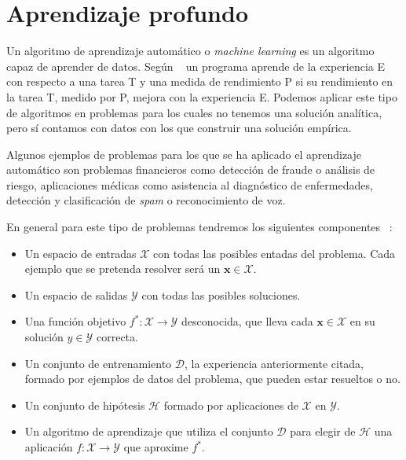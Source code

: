 
\chapter{Aprendizaje profundo}\label{deeplearning}

Un algoritmo de aprendizaje automático o \textit{machine learning} es un algoritmo capaz de aprender de datos. Según ~\cite{mitchell1997} un programa aprende de la experiencia E con respecto a una tarea T y una medida de rendimiento P si su rendimiento en la tarea T, medido por P, mejora con la experiencia E. Podemos aplicar este tipo de algoritmos en problemas para los cuales no tenemos una solución analítica, pero sí contamos con datos con los que construir una solución empírica.

Algunos ejemplos de problemas para los que se ha aplicado el aprendizaje automático son problemas financieros como detección de fraude o análisis de riesgo, aplicaciones médicas como asistencia al diagnóstico de enfermedades, detección y clasificación de \textit{spam} o reconocimiento de voz.

En general para este tipo de problemas tendremos los siguientes componentes ~\cite{abu2012learning}:

\begin{itemize}
  \item Un espacio de entradas $\mathcal{X}$ con todas las posibles entadas del problema. Cada ejemplo que se pretenda resolver será un $\textbf{x} \in \mathcal{X}$.
  \item Un espacio de salidas $\mathcal{Y}$ con todas las posibles soluciones.
  \item Una función objetivo $f^*:\mathcal{X} \rightarrow \mathcal{Y}$ desconocida, que lleva cada $\textbf{x} \in \mathcal{X}$ en su solución $y \in \mathcal{Y}$ correcta.
  \item Un conjunto de entrenamiento $\mathcal{D}$, la experiencia anteriormente citada, formado por ejemplos de datos del problema, que pueden estar resueltos o no.
  \item Un conjunto de hipótesis $\mathcal{H}$ formado por aplicaciones de $\mathcal{X}$ en $\mathcal{Y}$.
  \item Un algoritmo de aprendizaje que utiliza el conjunto $\mathcal{D}$ para elegir de $\mathcal{H}$ una aplicación $f:\mathcal{X} \rightarrow \mathcal{Y}$ que aproxime $f^*$.
\end{itemize}

